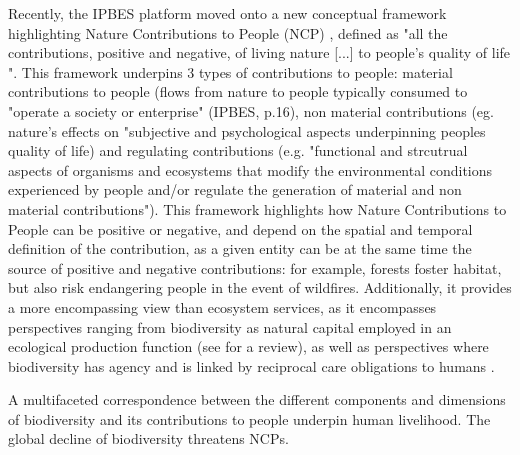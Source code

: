 Recently, the IPBES platform moved onto a new conceptual framework highlighting Nature Contributions to People (NCP) \citep{DIAZ20151}, defined as "all the contributions, positive and negative, of living nature [...] to people's quality of life \citep{diaz_2018}". This framework underpins 3 types of contributions to people: material contributions to people (flows from nature to people typically consumed to "operate a society or enterprise" (IPBES, p.16), non material contributions (eg. nature's effects on "subjective and psychological aspects underpinning peoples quality of life) and regulating contributions (e.g. "functional and strcutrual aspects of organisms and ecosystems that modify the environmental conditions experienced by people and/or regulate the generation of material and non material contributions"). This framework highlights how Nature Contributions to People can be positive or negative, and depend on the spatial and temporal definition of the contribution, as a given entity can be at the same time the source of positive and negative contributions: for example, forests foster habitat, but also risk endangering people in the event of wildfires. Additionally, it provides a more encompassing view than ecosystem services, as it encompasses perspectives ranging from biodiversity as natural capital employed in an ecological production function (see \cite{polasky_integrating_2009} for a review), as well as perspectives where biodiversity has agency and is linked by reciprocal care obligations to humans \citep{descola}. 

A multifaceted correspondence between the different components and dimensions of biodiversity and its contributions to people underpin human livelihood. The global decline of biodiversity threatens NCPs.

